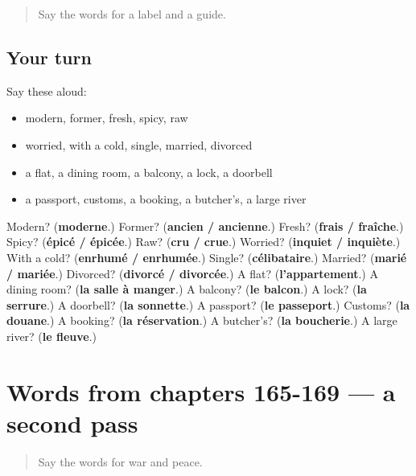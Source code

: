 \label{lesson:FR-R169-first-pass-words-from-chapters-161-164}



\begin{quote}
Say the words for a label and a guide.
\end{quote}

\subsection*{Your turn}
Say these aloud:

\begin{itemize}
\raggedright
  \item modern, former, fresh, spicy, raw
  \item worried, with a cold, single, married, divorced
  \item a flat, a dining room, a balcony, a lock, a doorbell
  \item a passport, customs, a booking, a butcher's, a large river
\end{itemize}

\begin{tcolorbox}[breakable,colback=teal!4,colframe=teal!35!black,title={Before you move on}]
Modern? (\textbf{moderne}.) Former? (\textbf{ancien / ancienne}.) Fresh? (\textbf{frais / fraîche}.) Spicy? (\textbf{épicé / épicée}.) Raw? (\textbf{cru / crue}.) Worried? (\textbf{inquiet / inquiète}.) With a cold? (\textbf{enrhumé / enrhumée}.) Single? (\textbf{célibataire}.) Married? (\textbf{marié / mariée}.) Divorced? (\textbf{divorcé / divorcée}.) A flat? (\textbf{l'appartement}.) A dining room? (\textbf{la salle à manger}.) A balcony? (\textbf{le balcon}.) A lock? (\textbf{la serrure}.) A doorbell? (\textbf{la sonnette}.) A passport? (\textbf{le passeport}.) Customs? (\textbf{la douane}.) A booking? (\textbf{la réservation}.) A butcher's? (\textbf{la boucherie}.) A large river? (\textbf{le fleuve}.)
\end{tcolorbox}
\section[(dialogue)]{Words from chapters 165-169 — a second pass}

\label{lesson:FR-R169-second-pass-words-from-chapters-165-169}



\begin{quote}
Say the words for war and peace.
\end{quote}

